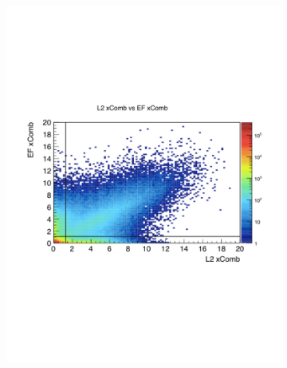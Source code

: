 \begin{figure}
    \center
	\begin{subfigure}[L2 and EF $b$-tags]{0.45\textwidth}\includegraphics[width=\textwidth]{TriggerCuts/L2_EF.pdf}\end{subfigure}

\end{figure}
